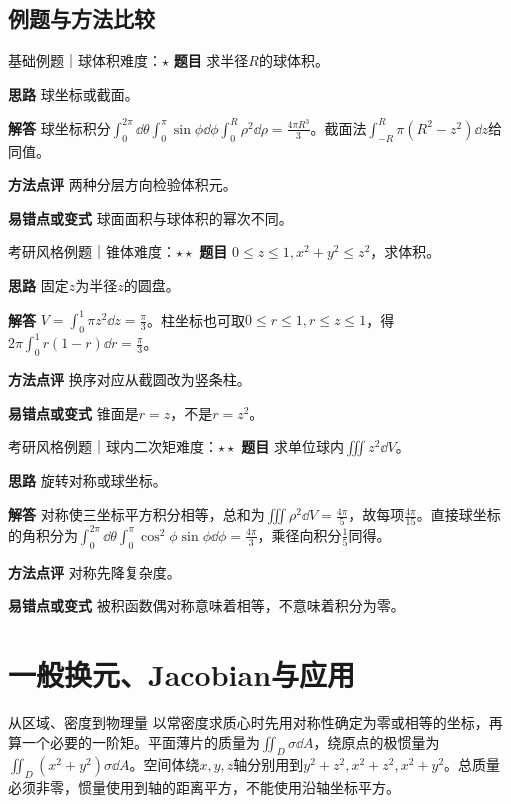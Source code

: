 \subsection{例题与方法比较}
\begin{example}{基础例题｜球体积}{难度：$\star$}
\label{ex:7:7}\textbf{题目} 求半径$R$的球体积。\par
\textbf{思路} 球坐标或截面。\par
\textbf{解答} 球坐标积分$\int_0^{2\pi}\dd\theta\int_0^\pi\sin\phi\dd\phi\int_0^R\rho^2\dd\rho=\frac{4\pi R^3}{3}$。截面法$\int_{-R}^R\pi(R^2-z^2)\dd z$给同值。\par
\textbf{方法点评} 两种分层方向检验体积元。\par
\textbf{易错点或变式} 球面面积与球体积的幂次不同。
\end{example}
\begin{example}{考研风格例题｜锥体}{难度：$\star\star$}
\label{ex:7:8}\textbf{题目} $0\le z\le1,x^2+y^2\le z^2$，求体积。\par
\textbf{思路} 固定$z$为半径$z$的圆盘。\par
\textbf{解答} $V=\int_0^1\pi z^2\dd z=\frac{\pi}{3}$。柱坐标也可取$0\le r\le1,r\le z\le1$，得$2\pi\int_0^1r(1-r)\dd r=\frac{\pi}{3}$。\par
\textbf{方法点评} 换序对应从截圆改为竖条柱。\par
\textbf{易错点或变式} 锥面是$r=z$，不是$r=z^2$。
\end{example}
\begin{example}{考研风格例题｜球内二次矩}{难度：$\star\star$}
\label{ex:7:9}\textbf{题目} 求单位球内$\iiint z^2\dd V$。\par
\textbf{思路} 旋转对称或球坐标。\par
\textbf{解答} 对称使三坐标平方积分相等，总和为$\iiint\rho^2\dd V=\frac{4\pi}{5}$，故每项$\frac{4\pi}{15}$。直接球坐标的角积分为$\int_0^{2\pi}\dd\theta\int_0^\pi\cos^2\phi\sin\phi\dd\phi=\frac{4\pi}{3}$，乘径向积分$\frac{1}{5}$同得。\par
\textbf{方法点评} 对称先降复杂度。\par
\textbf{易错点或变式} 被积函数偶对称意味着相等，不意味着积分为零。
\end{example}
\section{一般换元、Jacobian与应用}\label{sec:7:4}

\begin{method}{从区域、密度到物理量}
以常密度求质心时先用对称性确定为零或相等的坐标，再算一个必要的一阶矩。平面薄片的质量为$\iint_D\sigma\dd A$，绕原点的极惯量为$\iint_D(x^2+y^2)\sigma\dd A$。空间体绕$x,y,z$轴分别用到$y^2+z^2,x^2+z^2,x^2+y^2$。总质量必须非零，惯量使用到轴的距离平方，不能使用沿轴坐标平方。
\end{method}


